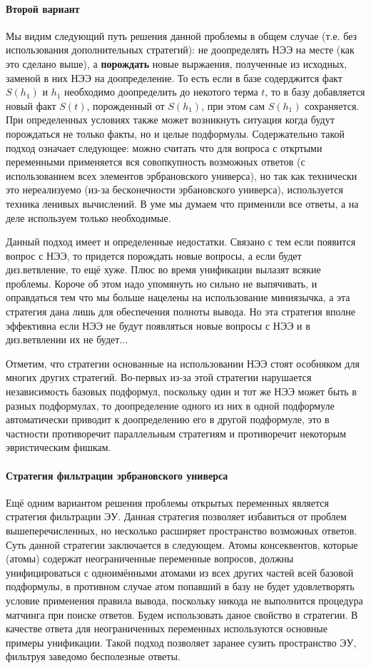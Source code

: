 \paragraph{Второй вариант}
Мы видим следующий путь решения данной проблемы в общем случае (т.е. без использования дополнительных стратегий): не доопределять НЭЭ на месте (как это сделано выше), а \textbf{порождать} новые выржаения, полученные из исходных, заменой в них НЭЭ на доопределение. То есть если в базе содерджится факт $S(h_1)$ и $h_1$ необходимо доопределить до некотого терма $t$, то в базу добавляется новый факт $S(t)$, порожденный от $S(h_1)$, при этом сам $S(h_1)$ сохраняется. При определенных условиях также может возникнуть ситуация когда будут порождаться не только факты, но и целые подформулы. 
Содержательно такой подход означает следующее: можно считать что для вопроса с откртыми переменными применяется вся совопкупность возможных ответов (с использованием всех элементов эрбрановского универса), но так как технически это нереализуемо (из-за бесконечности эрбановского универса), используется техника ленивых вычислений. В уме мы думаем что применили все ответы, а на деле используем только необходимые. 

Данный подход имеет и определенные недостатки. Связано с тем если появится вопрос с НЭЭ, то придется порождать новые вопросы, а если будет диз.ветвление, то ещё хуже. Плюс во время унификации вылазят всякие проблемы. Короче об этом надо упомянуть но сильно не выпячивать, и оправдаться тем что мы больше нацелены на использование миниязычка, а эта стратегия дана лишь для обеспечения полноты вывода. Но эта стратегия вполне эффективна если НЭЭ не будут появляться новые вопросы с НЭЭ и в диз.ветвлении их не будет... 

Отметим, что стратегии основанные на использовании НЭЭ стоят особняком для многих других стратегий. Во-первых из-за этой стратегии нарушается независимость базовых подформул, поскольку один и тот же НЭЭ может быть в разных подформулах, то доопределение одного из них в одной подформуле автоматически приводит к доопределению его в другой подформуле, это в частности противоречит параллельным стратегиям и противоречит некоторым эвристическим фишкам.

\paragraph{Стратегия фильтрации эрбрановского универса}
Ещё одним вариантом решения проблемы открытых переменных является стратегия фильтрации ЭУ. Данная стратегия позволяет избавиться от проблем вышеперечисленных, но несколько расширяет пространство возможных ответов. Суть данной стратегии заключается в следующем. Атомы консеквентов, которые (атомы) содержат неограниченные переменные вопросов, должны унифицироваться с одноимёнными атомами из всех других частей всей базовой подформулы, в противном случае атом попавший в базу не будет удовлетворять условие применения правила вывода, поскольку никода не выполнится процедура матчинга при поиске ответов. Будем использовать даное свойство в стратегии. В качестве ответа для неограниченных переменных используются основные примеры унификации. Такой подход позволяет заранее сузить пространство ЭУ, фильтруя заведомо бесполезные ответы.

